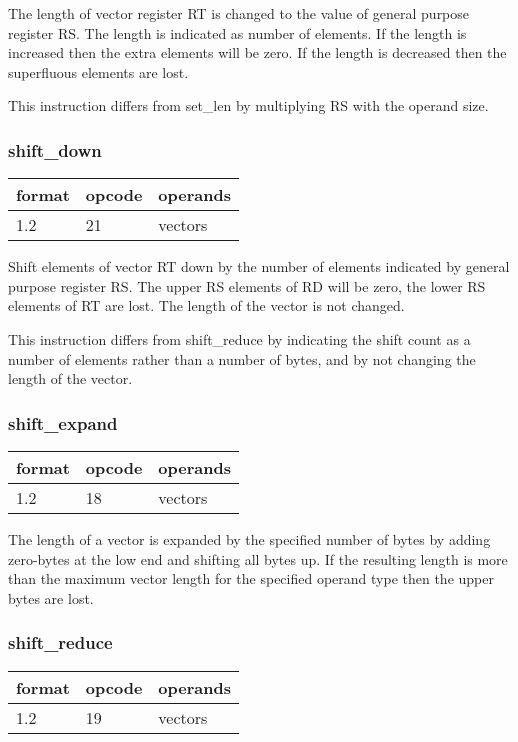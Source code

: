 \documentclass[forwardcom.tex]{subfiles}
\begin{document}
The length of vector register RT is changed to the value of general purpose register RS. The length is indicated as number of elements. If the length is increased then the extra elements will be zero. If the length is decreased then the superfluous elements are lost.

\vspace{2mm}
This instruction differs from set\_len by multiplying RS with the operand size.

\subsubsection{shift\_down}
\label{table:shiftDownInstruction}
\begin{tabular}{|p{12mm}|p{12mm}|p{110mm}|}
\hline
\bfseries format & \bfseries opcode & \bfseries operands \\ \hline
1.2 & 21 & vectors \\ \hline
\end{tabular}
\vspace{2mm}

Shift elements of vector RT down by the number of elements indicated by general purpose register RS. 
The upper RS elements of RD will be zero, the lower RS elements of RT are lost. The length of the vector is not changed.
\vspace{2mm}

This instruction differs from shift\_reduce by indicating the shift count as a number of elements rather than a number of bytes, and by not changing the length of the vector.


\subsubsection{shift\_expand}
\label{table:shiftExpandInstruction}
\begin{tabular}{|p{12mm}|p{12mm}|p{110mm}|}
\hline
\bfseries format & \bfseries opcode & \bfseries operands \\ \hline
1.2 & 18 & vectors \\ \hline
\end{tabular}
\vspace{2mm}

The length of a vector is expanded by the specified number of bytes by adding zero-bytes at the low end and shifting all bytes up. If the resulting length is more than the maximum vector length for the specified operand type then the upper bytes are lost.

\subsubsection{shift\_reduce}
\label{table:shiftReduceInstruction}
\begin{tabular}{|p{12mm}|p{12mm}|p{110mm}|}
\hline
\bfseries format & \bfseries opcode & \bfseries operands \\ \hline
1.2 & 19 & vectors \\ \hline
\end{tabular}
\vspace{2mm}
\end{document}
